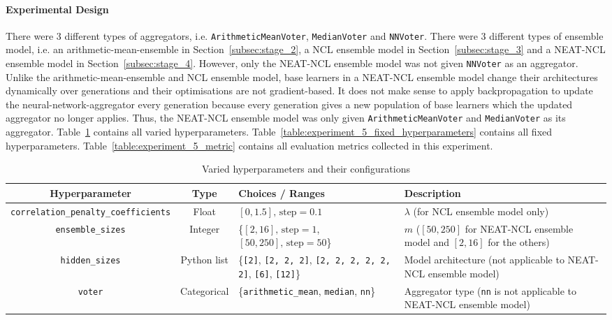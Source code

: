 \paragraph{Experimental Design}
There were 3 different types of aggregators, i.e. \texttt{ArithmeticMeanVoter}, \texttt{MedianVoter} and \texttt{NNVoter}. There were 3 different types of ensemble model, i.e. an arithmetic-mean-ensemble in Section~\ref{subsec:stage_2}, a NCL ensemble model in Section~\ref{subsec:stage_3} and a NEAT-NCL ensemble model in Section~\ref{subsec:stage_4}. However, only the NEAT-NCL ensemble model was not given \texttt{NNVoter} as an aggregator. Unlike the arithmetic-mean-ensemble and NCL ensemble model, base learners in a NEAT-NCL ensemble model change their architectures dynamically over generations and their optimisations are not gradient-based. It does not make sense to apply backpropagation to update the neural-network-aggregator every generation because every generation gives a new population of base learners which the updated aggregator no longer applies. Thus, the NEAT-NCL ensemble model was only given \texttt{ArithmeticMeanVoter} and \texttt{MedianVoter} as its aggregator. Table~\ref{table:experiment_5_varied_hyperparameters} contains all varied hyperparameters. Table~\ref{table:experiment_5_fixed_hyperparameters} contains all fixed hyperparameters. Table~\ref{table:experiment_5_metric} contains all evaluation metrics collected in this experiment. 

\begin{table}[H]
    \centering
    \begin{tabular}{|c|c|p{3cm}|p{4cm}|}
        \hline
        Hyperparameter & Type & Choices / Ranges & Description \\
        \hline
        \small\texttt{correlation\_penalty\_coefficients} & Float & $[0, 1.5]\text{, step}=0.1$ & $\lambda$ (for NCL ensemble model only) \\
        \hline
        \small\texttt{ensemble\_sizes} & Integer & \{$[2, 16]\text{, step}=1$, $[50, 250]\text{, step}=50$\} & $m$ ($[50, 250]$ for NEAT-NCL ensemble model and $[2, 16]$ for the others) \\
        \hline
        \small\texttt{hidden\_sizes} & Python list & \{\texttt{[2]}, \texttt{[2, 2, 2]}, \texttt{[2, 2, 2, 2, 2, 2]}, \texttt{[6]}, \texttt{[12]}\} & Model architecture (not applicable to NEAT-NCL ensemble model) \\
        \hline
        \small\texttt{voter} & Categorical & \{\texttt{arithmetic\_mean}, \texttt{median}, \texttt{nn}\} & Aggregator type (\texttt{nn} is not applicable to NEAT-NCL ensemble model) \\
        \hline
    \end{tabular}
    \caption{Varied hyperparameters and their configurations}
    \label{table:experiment_5_varied_hyperparameters}
\end{table}

